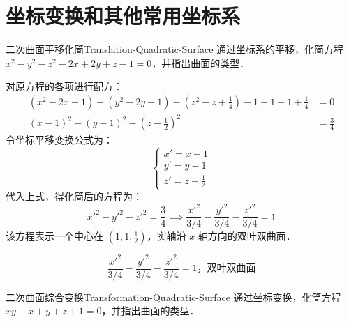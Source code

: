 \section{坐标变换和其他常用坐标系}

\begin{problem}{二次曲面平移化简}{Translation-Quadratic-Surface}
    通过坐标系的平移，化简方程 $x^2 - y^2 - z^2 - 2x + 2y + z - 1 = 0$，并指出曲面的类型．
\end{problem}

\begin{solution}
    对原方程的各项进行配方：
    \begin{equation}
        \begin{aligned}
            (x^2 - 2x + 1) - (y^2 - 2y + 1) - \left( z^2 - z + \frac{1}{4} \right) - 1 - 1 + 1 + \frac{1}{4} & = 0           \\
            (x - 1)^2 - (y - 1)^2 - \left( z - \frac{1}{2} \right)^2                                         & = \frac{3}{4}
        \end{aligned}
    \end{equation}
    令坐标平移变换公式为：
    \begin{equation}
        \begin{cases}
            x' = x - 1 \\
            y' = y - 1 \\
            z' = z - \frac{1}{2}
        \end{cases}
    \end{equation}
    代入上式，得化简后的方程为：
    \begin{equation}
        x'^2 - y'^2 - z'^2 = \frac{3}{4} \implies \frac{x'^2}{3/4} - \frac{y'^2}{3/4} - \frac{z'^2}{3/4} = 1
    \end{equation}
    该方程表示一个中心在 $\left( 1, 1, \frac{1}{2} \right)$，实轴沿 $x$ 轴方向的双叶双曲面．

    \begin{equation}
        \boxed{\frac{x'^2}{3/4} - \frac{y'^2}{3/4} - \frac{z'^2}{3/4} = 1，\text{双叶双曲面}}
    \end{equation}
\end{solution}

\begin{problem}{二次曲面综合变换}{Transformation-Quadratic-Surface}
    通过坐标变换，化简方程 $xy - x + y + z + 1 = 0$，并指出曲面的类型．
\end{problem}


